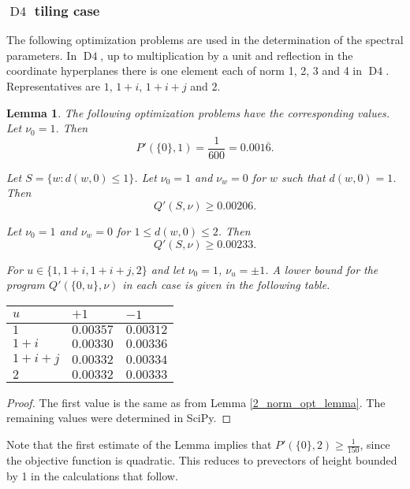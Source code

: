 \documentclass[a4paper, 12pt, notitlepage]{amsart}
\newcommand{\Dfour}{\operatorname{D4}}
\newtheorem{lemma}[theorem]{Lemma}
\theoremstyle{remark}
\begin{document}
\subsubsection{$\Dfour$ tiling case} \label{d4_section}
The following optimization problems are used in the determination of the spectral parameters. In $\Dfour$, up to multiplication by a unit and reflection in the coordinate hyperplanes there is one element each of norm 1, 2, 3 and 4 in $\Dfour$.  Representatives are $1$, $1+i$, $1+i+j$ and $2$.
\begin{lemma}\label{opt_program_lemma}
 The following optimization problems have the corresponding values.  Let $\nu_0 = 1$. Then 
 \begin{equation}
 P'(\{0\}, 1) = \frac{1}{600} = 0.001\overline{6}.  
 \end{equation}
 
 Let $S = \{w: d(w,0) \leq 1\}$.  Let $\nu_0 = 1$ and $\nu_w = 0$ for $w$ such that $d(w,0) = 1$. Then 
 \begin{equation}
 Q'(S, \nu) \geq 0.00206.
 \end{equation}
 
Let $\nu_0 = 1$ and $\nu_w = 0$ for $1 \leq d(w,0) \leq 2$.  Then
\begin{equation}
 Q'(S, \nu) \geq 0.00233.
\end{equation}

 
 For $u \in \{1, 1+i, 1+i+j, 2\}$ and let $\nu_0 = 1$, $\nu_u = \pm 1$.  A lower bound for the program $Q'(\{0,u\}, \nu)$ in each case is given in the following table.

\begin{tabular}{|l|l|l|}
 \hline
 $u$ & $+1$ & $-1$\\
 \hline
 $1$ &$0.00357$ & $0.00312$\\
 $1+i$ & $0.00330$&$0.00336$ \\
 $1+i+j$ & $0.00332$& $0.00334$\\
 $2$ &$0.00332$& $0.00333$\\
 \hline
\end{tabular}

\end{lemma}
\begin{proof}
 The first value is the same as from Lemma \ref{2_norm_opt_lemma}.  The remaining values were determined in SciPy.
\end{proof}
 
Note that the first estimate of the Lemma implies that $P'(\{0\}, 2) \geq \frac{1}{150}$, since the objective function is quadratic.  This reduces to prevectors of height bounded by 1 in the calculations that follow.
 
\end{document}
